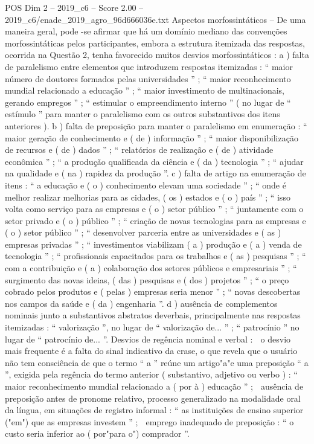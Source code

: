 \begin{textsample}{POS Dim 2 – 2019\_c6 – Score 2.00 – 2019\_c6/enade\_2019\_agro\_96d666036e.txt}
Aspectos morfossintáticos – De uma maneira geral, pode -se afirmar que há um domínio mediano das convenções morfossintáticas pelos participantes, embora a estrutura itemizada das respostas, ocorrida na Questão 2, tenha favorecido muitos desvios morfossintáticos : a ) falta de paralelismo entre elementos que introduzem respostas itemizadas : “ maior número de doutores formados pelas universidades ” ; “ maior reconhecimento mundial relacionado a educação ” ; “ maior investimento de multinacionais, gerando empregos ” ; “ estimular o empreendimento interno ” ( no lugar de “ estímulo ” para manter o paralelismo com os outros substantivos dos itens anteriores ). b ) falta de preposição para manter o paralelismo em enumeração : “ maior geração de conhecimento e ( de ) informação ” ; “ maior disponibilização de recursos e ( de ) dados ” ; “ relatórios de realização e ( de ) atividade econômica ” ; “ a produção qualificada da ciência e ( da ) tecnologia ” ; “ ajudar na qualidade e ( na ) rapidez da produção ”. c ) falta de artigo na enumeração de itens : “ a educação e ( o ) conhecimento elevam uma sociedade ” ; “ onde é melhor realizar melhorias para as cidades, ( os ) estados e ( o ) país ” ; “ isso volta como serviço para as empresas e ( o ) setor público ” ; “ juntamente com o setor privado e ( o ) público ” ; “ criação de novas tecnologias para as empresas e ( o ) setor público ” ; “ desenvolver parceria entre as universidades e ( as ) empresas privadas ” ; “ investimentos viabilizam ( a ) produção e ( a ) venda de tecnologia ” ; “ profissionais capacitados para os trabalhos e ( as ) pesquisas ” ; “ com a contribuição e ( a ) colaboração dos setores públicos e empresariais ” ; “ surgimento das novas ideias, ( das ) pesquisas e ( dos ) projetos ” ; “ o preço cobrado pelos produtos e ( pelas ) empresas seria menor ” ; “ novas descobertas nos campos da saúde e ( da ) engenharia ”. d ) ausência de complementos nominais junto a substantivos abstratos deverbais, principalmente nas respostas itemizadas : “ valorização ”, no lugar de “ valorização de... ” ; “ patrocínio ” no lugar de “ patrocínio de... ”.
Desvios de regência nominal e verbal :  o desvio mais frequente é a falta do sinal indicativo da crase, o que revela que o usuário não tem consciência de que o termo “ a ” reúne um artigo"a"e uma preposição “ a ”, exigida pela regência do termo anterior ( substantivo, adjetivo ou verbo ) : “ maior reconhecimento mundial relacionado a ( por à ) educação ” ;  ausência de preposição antes de pronome relativo, processo generalizado na modalidade oral da língua, em situações de registro informal : “ as instituições de ensino superior ("em") que as empresas investem ” ;  emprego inadequado de preposição : “ o custo seria inferior ao ( por"para o") comprador ”.

\end{textsample}
